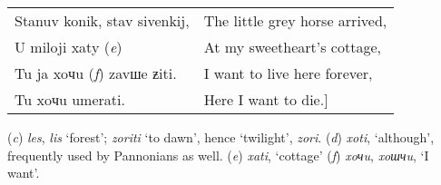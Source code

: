 \begin{small}
\begin{longtable}{ l l }
    Stanuv konik, stav sivenkij, & The little grey horse arrived, \\
    \hspace*{0.5cm}U miloji xaty (\textit{e}) & \hspace*{0.5cm}At my sweetheart’s cottage, \\
    Tu ja xoчu (\textit{f}) zavшe ƶiti. & I want to live here forever, \\
    \hspace*{0.5cm}Tu xoчu umerati. & \hspace*{0.5cm}Here I want to die.] \\
\end{longtable}
\end{small}
(\textit{c}) \textit{les}, \textit{lis} ‘forest’; \textit{zoriti} ‘to dawn’, hence ‘twilight’, \textit{zori}. (\textit{d}) \textit{xoti}, ‘although’, frequently used by Pannonians as well. (\textit{e}) \textit{xati}, ‘cottage’ (\textit{f}) \textit{xoчu}, \textit{xoшчu}, ‘I want’.

\enlargethispage{\baselineskip}

